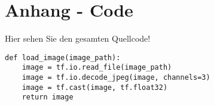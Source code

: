 \chapter{Anhang - Code}
Hier sehen Sie den gesamten Quellcode!

\begin{lstlisting}[language=pyhaff, caption={Lesen eines Bildes (CycleGAN Implementierung)}, label={cod:imageLoading}]
def load_image(image_path):
    image = tf.io.read_file(image_path)
    image = tf.io.decode_jpeg(image, channels=3)
    image = tf.cast(image, tf.float32)
    return image
\end{lstlisting}